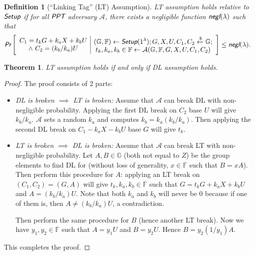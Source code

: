 \documentclass{article}
\newtheorem{definition}{Definition}[section]
\newtheorem{theorem}{Theorem}[section]
\begin{document}
\begin{definition}[``Linking Tag'' (LT) Assumption]
LT assumption holds relative to $\emph{\textsf{Setup}}$ if for all $\emph{\textsf{PPT}}$ adversary $\mathcal{A}$, there exists a negligible function $\emph{\textsf{negl}}(\lambda)$ such that
\begin{align*}
\emph{\textsf{Pr}}\left[
\begin{array}{c|c}
    \begin{gathered}
        C_1 = t_k G + k_a X + k_b U \\
        \wedge\ C_2 = (k_b/k_a)U
    \end{gathered}
    &
    \begin{gathered}
        (\mathbb{G}, \mathbb{F})\leftarrow\emph{\textsf{Setup}}(1^{\lambda}); G,X,U,C_1,C_2\xleftarrow{\$}\mathbb{G}; \\
        t_k,k_a,k_b\in\mathbb{F}\leftarrow\mathcal{A}(\mathbb{G}, \mathbb{F}, G, X, U, C_1, C_2) \\
    \end{gathered}
\end{array}
\right]
\le \emph{\textsf{negl}}(\lambda).
\end{align*}
\end{definition}

\begin{theorem}
LT assumption holds if and only if DL assumption holds.
\end{theorem}
\begin{proof}
The proof consists of 2 parts:
\begin{itemize}
\item \textit{DL is broken $\implies$ LT is broken:} Assume that $\mathcal{A}$ can break DL with non-negligible probability. Applying the first DL break on $C_2$ base $U$ will give $k_b/k_a$.  $\mathcal{A}$ sets a random $k_a$ and computes $k_b = k_a(k_b/k_a)$. Then applying the second DL break on $C_1 - k_a X - k_b U$ base $G$ will give $t_k$.

\item \textit{LT is broken $\implies$ DL is broken:} Assume that $\mathcal{A}$ can break LT with non-negligible probability. Let $A, B\in\mathbb{G}$ (both not equal to $Z$) be the group elements to find DL for (without loss of generality, $x\in\mathbb{F}$ such that $B=xA$). Then perform this procedure for $A$: applying an LT break on $(C_1, C_2) = (G, A)$ will give $t_k, k_a, k_b\in\mathbb{F}$ such that $G = t_k G + k_a X + k_b U$ and $A = (k_b/k_a)U$. Note that both $k_a$ and $k_b$ will never be $0$ because if one of them is, then $A \ne (k_b/k_a)U$, a contradiction.

Then perform the same procedure for $B$ (hence another LT break). Now we have $y_1, y_2\in\mathbb{F}$ such that $A=y_1 U$ and $B=y_2 U$. Hence $B = y_2(1/y_1)A$.
\end{itemize}
This completes the proof.
\end{proof}

%
%
\end{document}
